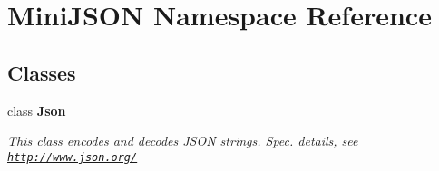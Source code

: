 \hypertarget{namespace_mini_j_s_o_n}{}\section{Mini\+J\+S\+ON Namespace Reference}
\label{namespace_mini_j_s_o_n}
\subsection*{Classes}
\begin{DoxyCompactItemize}
\item 
class {\bfseries Json}
\begin{DoxyCompactList}\small\item\em This class encodes and decodes J\+S\+ON strings. Spec. details, see \href{http://www.json.org/}{\tt http\+://www.\+json.\+org/} \end{DoxyCompactList}\end{DoxyCompactItemize}
